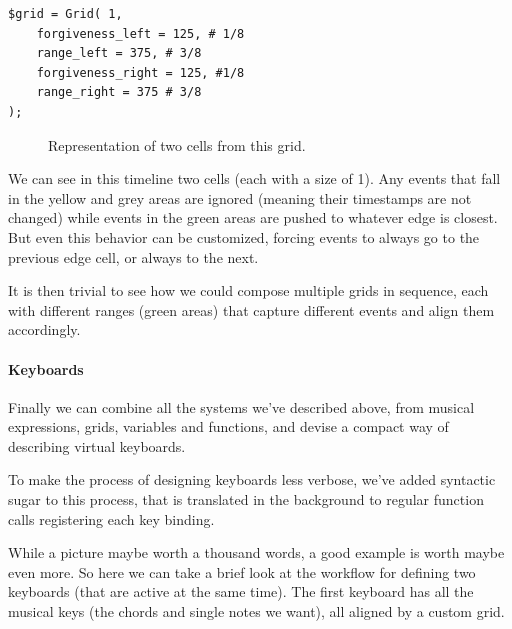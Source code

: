 \documentclass[a4paper,UKenglish,cleveref, autoref]{oasics-v2019}
\begin{document}
\begin{lstlisting}[caption={Declaring a grid},label=list:8,captionpos=t,abovecaptionskip=-\medskipamount]
$grid = Grid( 1,
    forgiveness_left = 125, # 1/8
    range_left = 375, # 3/8
    forgiveness_right = 125, #1/8
    range_right = 375 # 3/8
);
\end{lstlisting}

\begin{figure}[ht]
  \centering
  {%
  \setlength{\fboxsep}{0pt}%
  \setlength{\fboxrule}{0pt}%
  }%
  \caption{Representation of two cells from this grid.}
  \label{fig:grid}
\end{figure}

We can see in this timeline two cells (each with a size of 1). Any events that fall in the yellow and grey areas are ignored (meaning their timestamps are not changed) while events in the green areas are pushed to whatever edge is closest. But even this behavior can be customized, forcing events to always go to the previous edge cell, or always to the next.

It is then trivial to see how we could compose multiple grids in sequence, each with different ranges (green areas) that capture different events and align them accordingly.

\paragraph*{Keyboards}
Finally we can combine all the systems we've described above, from musical expressions, grids, variables and functions, and devise a compact way of describing virtual keyboards.

To make the process of designing keyboards less verbose, we've added syntactic sugar to this process, that is translated in the background to regular function calls registering each key binding.

While a picture maybe worth a thousand words, a good example is worth maybe even more. So here we can take a brief look at the workflow for defining two keyboards (that are active at the same time). The first keyboard has all the musical keys (the chords and single notes we want), all aligned by a custom grid.
\end{document}
